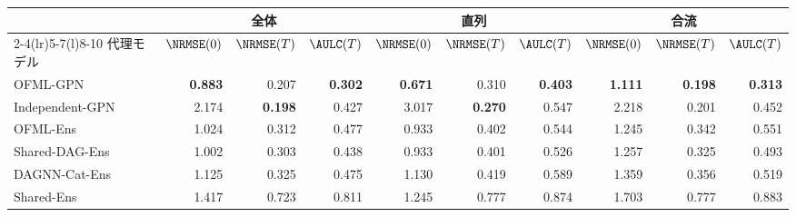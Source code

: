 \begin{tabular}{@{}l rrr rrr rrr@{}}
\toprule
 & \multicolumn{3}{c}{全体} & \multicolumn{3}{c}{直列} & \multicolumn{3}{c}{合流}\\
\cmidrule(lr){2-4}\cmidrule(lr){5-7}\cmidrule(l){8-10}
代理モデル & $\NRMSE(0)$ & $\NRMSE(T)$ & $\AULC(T)$ & $\NRMSE(0)$ & $\NRMSE(T)$ & $\AULC(T)$ & $\NRMSE(0)$ & $\NRMSE(T)$ & $\AULC(T)$\\
\midrule
OFML-GPN & \textbf{0.883} & 0.207 & \textbf{0.302} & \textbf{0.671} & 0.310 & \textbf{0.403} & \textbf{1.111} & \textbf{0.198} & \textbf{0.313} \\
Independent-GPN & 2.174 & \textbf{0.198} & 0.427 & 3.017 & \textbf{0.270} & 0.547 & 2.218 & 0.201 & 0.452 \\
OFML-Ens & 1.024 & 0.312 & 0.477 & 0.933 & 0.402 & 0.544 & 1.245 & 0.342 & 0.551 \\
Shared-DAG-Ens & 1.002 & 0.303 & 0.438 & 0.933 & 0.401 & 0.526 & 1.257 & 0.325 & 0.493 \\
DAGNN-Cat-Ens & 1.125 & 0.325 & 0.475 & 1.130 & 0.419 & 0.589 & 1.359 & 0.356 & 0.519 \\
Shared-Ens & 1.417 & 0.723 & 0.811 & 1.245 & 0.777 & 0.874 & 1.703 & 0.777 & 0.883 \\
\bottomrule
\end{tabular}
